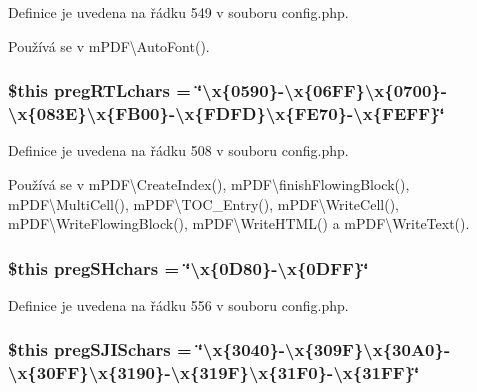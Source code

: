Definice je uvedena na řádku 549 v souboru config.\-php.



Používá se v m\-P\-D\-F\textbackslash{}\-Auto\-Font().

\hypertarget{config_8php_a9204e6850b1f29e872274d4676417dfb}{
\subsubsection[{preg\-R\-T\-Lchars}]{\setlength{\rightskip}{0pt plus 5cm}\$this preg\-R\-T\-Lchars = \char`\"{}\textbackslash{}x\{0590\}-\/\textbackslash{}x\{06\-F\-F\}\textbackslash{}x\{0700\}-\/\textbackslash{}x\{083\-E\}\textbackslash{}x\{\-F\-B00\}-\/\textbackslash{}x\{\-F\-D\-F\-D\}\textbackslash{}x\{\-F\-E70\}-\/\textbackslash{}x\{\-F\-E\-F\-F\}\char`\"{}}}\label{config_8php_a9204e6850b1f29e872274d4676417dfb}


Definice je uvedena na řádku 508 v souboru config.\-php.



Používá se v m\-P\-D\-F\textbackslash{}\-Create\-Index(), m\-P\-D\-F\textbackslash{}finish\-Flowing\-Block(), m\-P\-D\-F\textbackslash{}\-Multi\-Cell(), m\-P\-D\-F\textbackslash{}\-T\-O\-C\-\_\-\-Entry(), m\-P\-D\-F\textbackslash{}\-Write\-Cell(), m\-P\-D\-F\textbackslash{}\-Write\-Flowing\-Block(), m\-P\-D\-F\textbackslash{}\-Write\-H\-T\-M\-L() a m\-P\-D\-F\textbackslash{}\-Write\-Text().

\hypertarget{config_8php_a404ba7c2d5ac2fcaee621139c7ef950e}{
\subsubsection[{preg\-S\-Hchars}]{\setlength{\rightskip}{0pt plus 5cm}\$this preg\-S\-Hchars = \char`\"{}\textbackslash{}x\{0\-D80\}-\/\textbackslash{}x\{0\-D\-F\-F\}\char`\"{}}}\label{config_8php_a404ba7c2d5ac2fcaee621139c7ef950e}


Definice je uvedena na řádku 556 v souboru config.\-php.

\hypertarget{config_8php_aed738d51f0dc79e2b58567ab98d6e594}{
\subsubsection[{preg\-S\-J\-I\-Schars}]{\setlength{\rightskip}{0pt plus 5cm}\$this preg\-S\-J\-I\-Schars = \char`\"{}\textbackslash{}x\{3040\}-\/\textbackslash{}x\{309\-F\}\textbackslash{}x\{30\-A0\}-\/\textbackslash{}x\{30\-F\-F\}\textbackslash{}x\{3190\}-\/\textbackslash{}x\{319\-F\}\textbackslash{}x\{31\-F0\}-\/\textbackslash{}x\{31\-F\-F\}\char`\"{}}}\label{config_8php_aed738d51f0dc79e2b58567ab98d6e594}



